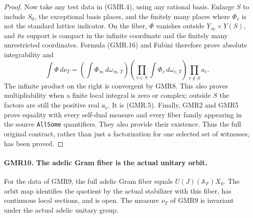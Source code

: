 \begin{proof}
Now take any test data in (GMR.4), using any rational basis.  Enlarge
$S$ to include $S_0$, the exceptional basis places, and the finitely
many places where $\Phi_v$ is not the standard lattice indicator.
On the fiber, $\Phi$ vanishes outside $Y_\infty\times Y(S)$, and its
support is compact in the infinite coordinate and the finitely many
unrestricted coordinates.  Formula (GMR.16) and Fubini therefore
prove absolute integrability and
\[
 \int\Phi\,d\nu_T
 =\left(\int\Phi_\infty\,d\omega_{\infty,T}\right)
   \left(\prod_{v\in S}\int\Phi_v\,d\omega_{v,T}\right)
   \prod_{v\notin S}a_v.
 \tag{GMR.17}
\]
The infinite product on the right is convergent by GMR8.  This also
proves multipliability when a finite local integral is zero or
complex; outside $S$ the factors are still the positive real $a_v$.
It is (GMR.5).  Finally, GMR2 and GMR5 prove equality with every
self-dual measure and every fiber family appearing in the source
\texttt{AllSome} quantifiers.  They also provide their existence.
Thus the full original contract, rather than just a factorization
for one selected set of witnesses, has been proved.
\end{proof}

\paragraph{GMR10. The adelic Gram fiber is the actual unitary orbit.}
\label{claim:GMR10}
For the data of GMR9, the full adelic Gram fiber equals
$U(J)(\mathbb A_F)X_0$.  The orbit map identifies the quotient by the
actual stabilizer with this fiber, has continuous local sections, and
is open.  The measure $\nu_T$ of GMR9 is invariant under the actual
adelic unitary group.

